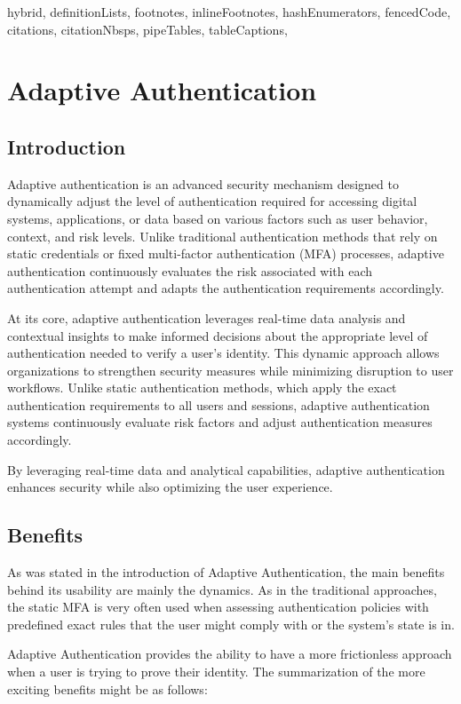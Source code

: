 \documentclass[
  digital,     %
  oneside,     %
  nosansbold,  %
  nocolorbold, %
  lof,         %
  lot,         %
]{fithesis4}
\begin{document}
\shorthandoff{-}
\begin{markdown*}{%
  hybrid,
  definitionLists,
  footnotes,
  inlineFootnotes,
  hashEnumerators,
  fencedCode,
  citations,
  citationNbsps,
  pipeTables,
  tableCaptions,
}
\chapter{Adaptive Authentication}
\section{Introduction}
Adaptive authentication is an advanced security mechanism designed to dynamically adjust the level of authentication required for accessing digital systems, applications, or data based on various factors such as user behavior, context, and risk levels.
Unlike traditional authentication methods that rely on static credentials or fixed multi-factor authentication (MFA) processes, adaptive authentication continuously evaluates the risk associated with each authentication attempt and adapts the authentication requirements accordingly.

At its core, adaptive authentication leverages real-time data analysis and contextual insights to make informed decisions about the appropriate level of authentication needed to verify a user's identity.
This dynamic approach allows organizations to strengthen security measures while minimizing disruption to user workflows.
Unlike static authentication methods, which apply the exact authentication requirements to all users and sessions, adaptive authentication systems continuously evaluate risk factors and adjust authentication measures accordingly.

By leveraging real-time data and analytical capabilities, adaptive authentication enhances security while also optimizing the user experience.
\newpage
\section{Benefits}
As was stated in the introduction of Adaptive Authentication, the main benefits behind its usability are mainly the dynamics.
As in the traditional approaches, the static MFA is very often used when assessing authentication policies with predefined exact rules that the user might comply with or the system's state is in.

Adaptive Authentication provides the ability to have a more frictionless approach when a user is trying to prove their identity.
\newline
\newline
The summarization of the more exciting benefits might be as follows:


\end{markdown*}
\end{document}
